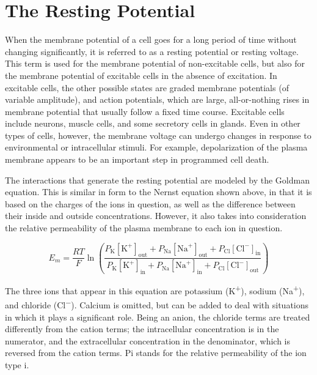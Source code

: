 \hypertarget{the-resting-potential}{%
\section{The Resting Potential}\label{the-resting-potential}}

When the membrane potential of a cell goes for a long period of time without changing significantly, it is referred to as a resting potential or resting voltage. This term is used for the membrane potential of non-excitable cells, but also for the membrane potential of excitable cells in the absence of excitation. In excitable cells, the other possible states are graded membrane potentials (of variable amplitude), and action potentials, which are large, all-or-nothing rises in membrane potential that usually follow a fixed time course. Excitable cells include neurons, muscle cells, and some secretory cells in glands. Even in other types of cells, however, the membrane voltage can undergo changes in response to environmental or intracellular stimuli. For example, depolarization of the plasma membrane appears to be an important step in programmed cell death.

The interactions that generate the resting potential are modeled by the Goldman equation. This is similar in form to the Nernst equation shown above, in that it is based on the charges of the ions in question, as well as the difference between their inside and outside concentrations. However, it also takes into consideration the relative permeability of the plasma membrane to each ion in question.

\[ E_{m} = \frac{RT}{F} \ln{ \left( \frac{ P_{\mathrm{K}}[\mathrm{K}^{+}]_\mathrm{out} + P_{\mathrm{Na}}[\mathrm{Na}^{+}]_\mathrm{out} + P_{\mathrm{Cl}}[\mathrm{Cl}^{-}]_\mathrm{in}}{ P_{\mathrm{K}}[\mathrm{K}^{+}]_\mathrm{in} + P_{\mathrm{Na}}[\mathrm{Na}^{+}]_\mathrm{in} + P_{\mathrm{Cl}}[\mathrm{Cl}^{-}]_\mathrm{out}} \right) } \]

The three ions that appear in this equation are potassium (K\textsuperscript{+}), sodium (Na\textsuperscript{+}), and chloride (Cl\textsuperscript{−}). Calcium is omitted, but can be added to deal with situations in which it plays a significant role. Being an anion, the chloride terms are treated differently from the cation terms; the intracellular concentration is in the numerator, and the extracellular concentration in the denominator, which is reversed from the cation terms. Pi stands for the relative permeability of the ion type i.

